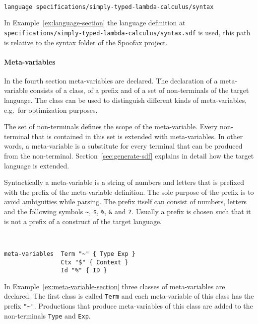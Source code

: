 \begin{example}{~}
\begin{lstlisting}[language=sltc]
language specifications/simply-typed-lambda-calculus/syntax
\end{lstlisting}
\label{ex:language-section}
\end{example}

In Example~\ref{ex:language-section} the language definition at
\lstinline[breaklines=true]|specifications/simply-typed-lambda-calculus/syntax.sdf|
is used, this path is relative to the syntax folder of the Spoofax
project.

\paragraph{Meta-variables} In the fourth section meta-variables are
declared. The declaration of a meta-variable consists of a class, of a
prefix and of a set of non-terminals of the target language. The class
can be used to distinguish different kinds of meta-variables, e.g.\
for optimization purposes. 

The set of non-terminals defines the scope of the meta-variable. Every
non-terminal that is contained in this set is extended with
meta-variables. In other words, a meta-variable is a substitute for
every terminal that can be produced from the
non-terminal. Section~\ref{sec:generate-sdf} explains in detail how
the target language is extended.

Syntactically a meta-variable is a string of numbers and letters that
is prefixed with the prefix of the meta-variable definition. The sole
purpose of the prefix is to avoid ambiguities while parsing. The
prefix itself can consist of numbers, letters and the following
symbols \verb|~|, \verb|$|, \verb|%|, \verb|&| and \verb|?|.
 Usually a prefix is chosen such that it
is not a prefix of a construct of the target language.

\begin{example}{~}
\begin{lstlisting}[language=sltc]
meta-variables 	Term "~" { Type Exp }
                Ctx "$" { Context }
                Id "%" { ID }
\end{lstlisting}
\label{ex:meta-variable-section}
\end{example}

In Example~\ref{ex:meta-variable-section} three classes of
meta-variables are declared. The first class is called \verb|Term| and
each meta-variable of this class has the prefix
\verb|"~"|. Productions that produce meta-variables of this class are
added to the non-terminals \verb|Type| and \verb|Exp|.

